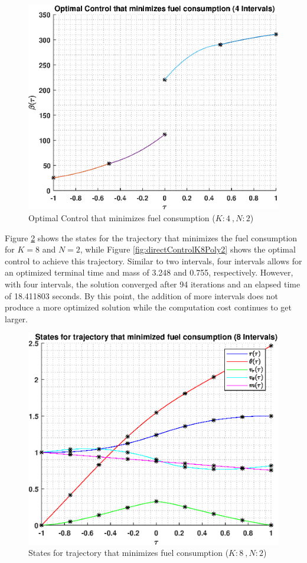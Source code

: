 \documentclass[]{article}
\begin{document}
\begin{figure}
	\centering
	\includegraphics[scale=0.75]{directControlK4Poly2.eps}
	\caption{Optimal Control that minimizes fuel consumption (\(K:4\ , N:2\))}
	\label{fig:directControlK4Poly2}
\end{figure}
\vspace{2mm}\newline 
Figure \ref{fig:directStatesK8Poly2} shows the states for the trajectory that minimizes the fuel consumption for \(K = 8\) and  \(N = 2\), while Figure \ref{fig:directControlK8Poly2} shows the optimal control to achieve this trajectory. Similar to two intervals, four intervals allows for an optimized terminal time and mass of 3.248 and 0.755, respectively. However, with four intervals, the solution converged after 94 iterations and an elapsed time of 18.411803 seconds. By this point, the addition of more intervals does not produce a more optimized solution while the computation cost continues to get larger.
\begin{figure}
	\centering
	\includegraphics[scale=0.75]{directStatesK8Poly2.eps}
	\caption{States for trajectory that minimizes fuel consumption (\(K:8\ , N:2\))}
	\label{fig:directStatesK8Poly2}
\end{figure}
\end{document}
